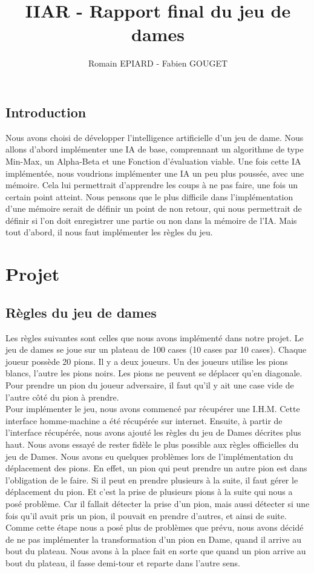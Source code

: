 \documentclass[a4paper, title page, 12pt]{report}
\title{IIAR - Rapport final du jeu de dames}
\author{Romain EPIARD - Fabien GOUGET}
\date{}
\begin{document}
		
		
	\setcounter{page}{1}
	\newpage

	\tableofcontents
	\newpage
	\section*{Introduction}
	Nous avons choisi de développer l'intelligence artificielle d'un jeu de dame. Nous allons d'abord implémenter une IA de base, comprennant un algorithme de type Min-Max, un Alpha-Beta et une Fonction d'évaluation viable. Une fois cette IA implémentée, nous voudrions implémenter une IA un peu plus poussée, avec une mémoire. Cela lui permettrait d'apprendre les coups à ne pas faire, une fois un certain point atteint. Nous pensons que le plus difficile dans l'implémentation d'une mémoire serait de définir un point de non retour, qui nous permettrait de définir si l'on doit enregistrer une partie ou non dans la mémoire de l'IA. Mais tout d'abord, il nous faut implémenter les règles du jeu.
	\newpage	
	\chapter{Projet}
	\section{Règles du jeu de dames}
	Les règles suivantes sont celles que nous avons implémenté dans notre projet. Le jeu de dames se joue sur un plateau de 100 cases (10 cases par 10 cases). Chaque joueur possède 20 pions. Il y a deux joueurs. Un des joueurs utilise les pions blancs, l'autre les pions noirs. Les pions ne peuvent se déplacer qu'en diagonale. Pour prendre un pion du joueur adversaire, il faut qu'il y ait une case vide de l'autre côté du pion à prendre.\\
	
	Pour implémenter le jeu, nous avons commencé par récupérer une I.H.M. Cette interface homme-machine a été récupérée sur internet. Ensuite, à partir de l'interface récupérée, nous avons ajouté les règles du jeu de Dames décrites plus haut. Nous avons essayé de rester fidèle le plus possible aux règles officielles du jeu de Dames. Nous avons eu quelques problèmes lors de l'implémentation du déplacement des pions. En effet, un pion qui peut prendre un autre pion est dans l'obligation de le faire. Si il peut en prendre plusieurs à la suite, il faut gérer le déplacement du pion. Et c'est la prise de plusieurs pions à la suite qui nous a posé problème. Car il fallait détecter la prise d'un pion, mais aussi détecter si une fois qu'il avait pris un pion, il pouvait en prendre d'autres, et ainsi de suite. Comme cette étape nous a posé plus de problèmes que prévu, nous avons décidé de ne pas implémenter la transformation d'un pion en Dame, quand il arrive au bout du plateau. Nous avons à la place fait en sorte que quand un pion arrive au bout du plateau, il fasse demi-tour et reparte dans l'autre sens.\\ 
	
\end{document}
